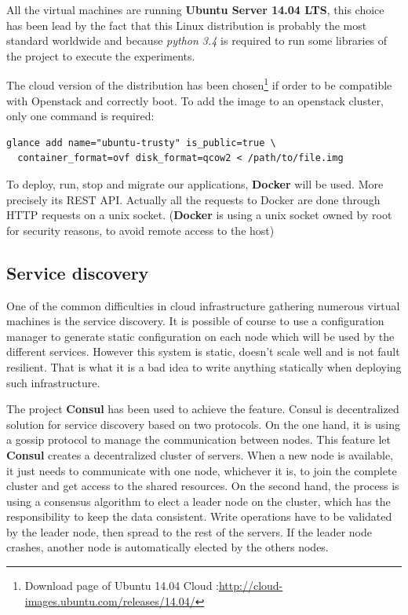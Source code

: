 All the virtual machines are running \textbf{Ubuntu Server 14.04 LTS}, this choice
has been lead by the fact that this Linux distribution is probably the most standard
worldwide and because \textit{python 3.4} is required to run some libraries of the project
to execute the experiments.

The cloud version of the distribution has been chosen\footnote{Download page of
Ubuntu 14.04 Cloud :\url{http://cloud-images.ubuntu.com/releases/14.04/}} if
order to be compatible with Openstack and correctly boot. To add the image to
an openstack cluster, only one command is required:

\vspace{1em}
\begin{lstlisting}
glance add name="ubuntu-trusty" is_public=true \ 
  container_format=ovf disk_format=qcow2 < /path/to/file.img
\end{lstlisting}

To deploy, run, stop and migrate our applications, \textbf{Docker} will be
used. More precisely its REST API. Actually all the requests to Docker are done
through HTTP requests on a unix socket. (\textbf{Docker} is using a unix socket
owned by root for security reasons, to avoid remote access to the host)

\subsection{Service discovery}

One of the common difficulties in cloud infrastructure gathering numerous
virtual machines is the service discovery. It is possible of course to use a
configuration manager to generate static configuration on each node which will
be used by the different services. However this system is static, doesn't scale
well and is not fault resilient. That is what it is a bad idea to write
anything statically when deploying such infrastructure.

The project \textbf{Consul} has been used to achieve the feature. Consul is
decentralized solution for service discovery based on two protocols. On the one
hand, it is using a gossip protocol to manage the communication between nodes.
This feature let \textbf{Consul} creates a decentralized cluster of servers.
When a new node is available, it just needs to communicate with one node,
whichever it is, to join the complete cluster and get access to the shared
resources. On the second hand, the process is using a consensus algorithm to
elect a leader node on the cluster, which has the responsibility to keep the
data consistent. Write operations have to be validated by the leader node, then
spread to the rest of the servers. If the leader node crashes, another node is
automatically elected by the others nodes.

